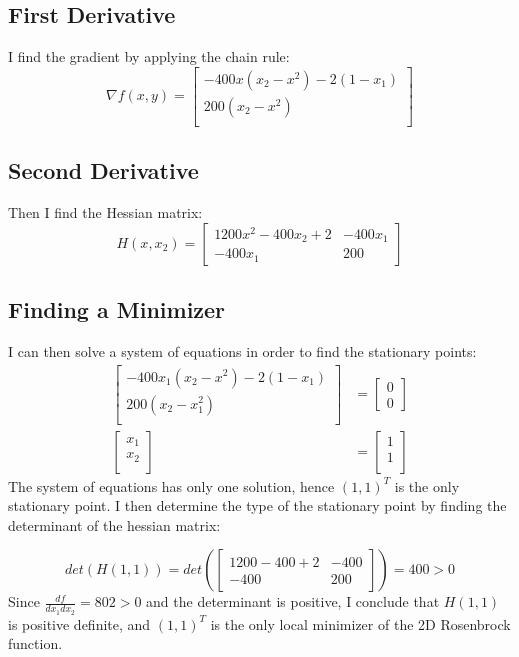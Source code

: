 \documentclass[a4paper]{article}
\begin{document}
\subsection{First Derivative}
I find the gradient by applying the chain rule:
\[
\nabla f(x,y) = 
\begin{bmatrix}
    -400x(x_2 - x^2) - 2(1-x_1) \\
    200(x_2 - x^2)            \\
\end{bmatrix}
\]
\subsection{Second Derivative}
Then I find the Hessian matrix:
\[
H(x,x_2) = 
\begin{bmatrix}
    1200x^2 - 400x_2 + 2 & -400x_1     \\
    -400x_1 & 200
\end{bmatrix}
\]

\subsection{Finding a Minimizer}
I can then solve a system of equations in order to find the stationary points:
\begin{align*}
\begin{bmatrix}
    -400x_1(x_2 - x^2) - 2(1-x_1) \\
    200(x_2 - x_1^2)            \\
\end{bmatrix}
&=
\begin{bmatrix}
    0 \\
    0    
\end{bmatrix}\\
\begin{bmatrix}
    x_1 \\
    x_2 \\
\end{bmatrix}
&=
\begin{bmatrix}
    1 \\
    1 \\
\end{bmatrix}
\end{align*}
The system of equations has only one solution, hence $(1,1)^T$ is the only
stationary point. I then determine the type of the stationary point by 
finding the determinant of the hessian matrix:

\[
det(H(1,1)) = 
det\left(\begin{bmatrix}
    1200 - 400 + 2 & -400     \\
    -400 & 200
\end{bmatrix}\right)
= 400 > 0
\]
Since $\frac{df}{dx_1dx_2} = 802 > 0$ and the determinant is positive, I conclude that
$H(1,1)$ is positive definite, and $(1,1)^T$ is the only local minimizer of the
2D Rosenbrock function.
\end{document}
